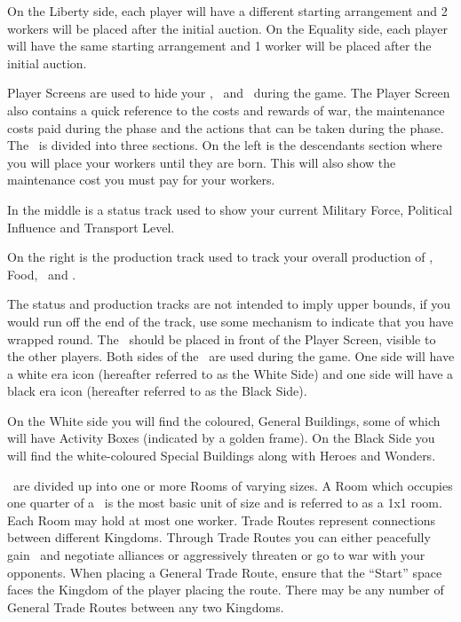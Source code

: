 \documentclass[10pt,twocolumn]{article}
\begin{document}
On the Liberty side, each player will have a different starting arrangement and 2 workers will be placed after the initial auction. On the Equality side, each player will have the same starting arrangement and 1 worker will be placed after the initial auction.

Player Screens are used to hide your \goods, \vps\ and \money\ during the game. The Player Screen also contains a quick reference to the costs and rewards of war, the maintenance costs paid during the  phase and the actions that can be taken during the  phase.
\compHead{\psb}
The \psb\ is divided into three sections. On the left is the descendants section where you will place your workers until they are born. This will also show the maintenance cost you must pay for your workers.

In the middle is a status track used to show your current Military Force, Political Influence and Transport Level.

On the right is the production track used to track your overall production of \minerals, Food, \vps\ and \money.

The status and production tracks are not intended to imply upper bounds, if you would run off the end of the track, use some mechanism to indicate that you have wrapped round. The \psb\ should be placed in front of the Player Screen, visible to the other players.
\compHead{\landcards}
Both sides of the \landcards\ are used during the game. One side will have a white era icon (hereafter referred to as the White Side) and one side will have a black era icon (hereafter referred to as the Black Side).

On the White side you will find the coloured, General Buildings, some of which will have Activity Boxes (indicated by a golden frame). On the Black Side you will find the white-coloured Special Buildings along with Heroes and Wonders.

\landcards\ are divided up into one or more Rooms of varying sizes. A Room which occupies one quarter of a \landcard\ is the most basic unit of size and is referred to as a 1x1 room. Each Room may hold at most one worker.
Trade Routes represent connections between different Kingdoms. Through Trade Routes you can either peacefully gain \goods\ and negotiate alliances or aggressively threaten or go to war with your opponents. When placing a General Trade Route, ensure that the ``Start'' space faces the Kingdom of the player placing the route. There may be any number of General Trade Routes between any two Kingdoms.
\end{document}
